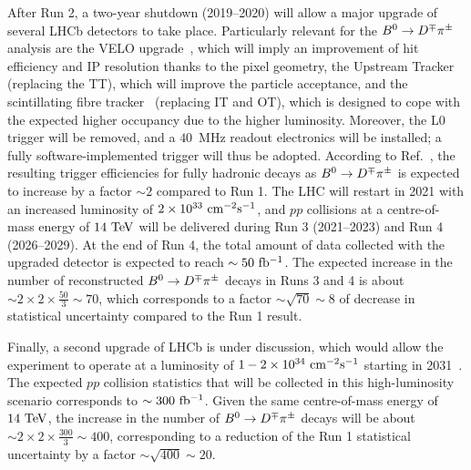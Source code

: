After Run 2, a two-year shutdown (2019--2020) will allow 
a major upgrade of several LHCb detectors to take place. Particularly relevant for the $B^0\rightarrow D^\mp\pi^\pm$ analysis
are the VELO upgrade~\cite{LHCb-TDR-013}, which will imply an improvement of hit efficiency and IP resolution thanks to the pixel geometry,
the Upstream Tracker~\cite{Collaboration:1647400} (replacing the TT), which will improve the particle acceptance,  
and the scintillating
fibre tracker~\cite{Collaboration:1647400} (replacing IT and OT), which is designed to cope with the expected higher occupancy due to the higher luminosity.
Moreover, the L0 trigger will be removed, and a $40$~MHz readout electronics will be installed; a fully software-implemented trigger will thus be adopted.
According to Ref.~\cite{LHCb-PUB-2014-040}, the resulting trigger efficiencies for fully hadronic decays as $B^0\rightarrow D^\mp\pi^\pm$ is expected to
increase by a factor $\sim 2$ compared to Run 1.
The LHC will restart in 2021 with an increased luminosity of $2\times 10^{33}~\rm cm^{-2}s^{-1}$,
and $pp$ collisions at a centre-of-mass energy of $14~\rm TeV$ will be delivered during Run 3 (2021--2023) and Run 4 (2026--2029).
At the end of Run 4, the total amount of data collected with the upgraded detector is expected to reach $\sim 50~\rm fb^{-1}$. 
The expected increase in the number of reconstructed $B^0\rightarrow D^\mp\pi^\pm$ decays
in Runs 3 and 4 is about $\sim 2\times 2\times \frac{50}{3}\sim 70$, which corresponds to a factor $\sim\sqrt{70}\sim 8$ of decrease in statistical uncertainty
compared to the Run 1 result.

Finally, a second upgrade of LHCb is under discussion, which would allow the experiment
to operate at a luminosity of $1-2\times 10^{34}~\rm cm^{-2}s^{-1}$ starting in 2031~\cite{Upgrade2}.
The expected $pp$ collision statistics that will be collected in this high-luminosity scenario corresponds to $\sim 300~\rm fb^{-1}$.
Given the same centre-of-mass energy of $14~\rm TeV$, the increase in the number of $B^0\rightarrow D^\mp\pi^\pm$ decays will be about $\sim 2\times2\times \frac{300}{3}\sim 400$, corresponding to a reduction of the Run 1 statistical uncertainty by a factor $\sim\sqrt{400}\sim 20$.


